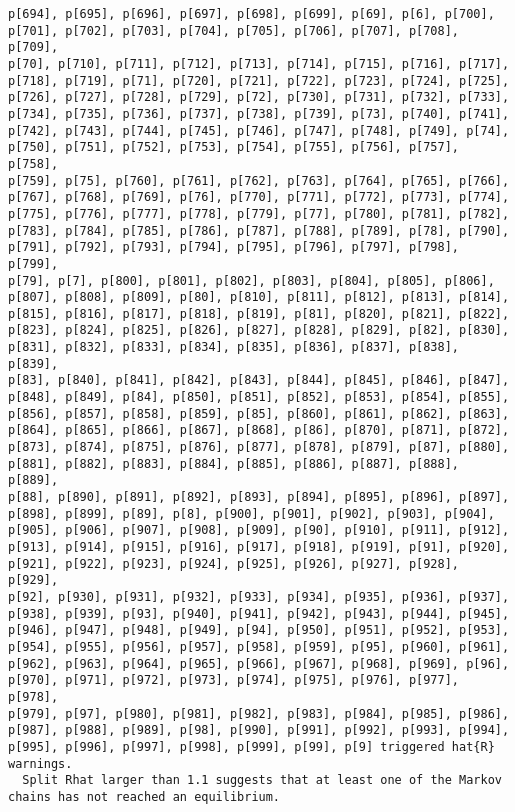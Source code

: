 \documentclass[
  letterpaper,
  DIV=11,
  numbers=noendperiod]{scrartcl}
\begin{document}
\begin{verbatim}
p[694], p[695], p[696], p[697], p[698], p[699], p[69], p[6], p[700],
p[701], p[702], p[703], p[704], p[705], p[706], p[707], p[708], p[709],
p[70], p[710], p[711], p[712], p[713], p[714], p[715], p[716], p[717],
p[718], p[719], p[71], p[720], p[721], p[722], p[723], p[724], p[725],
p[726], p[727], p[728], p[729], p[72], p[730], p[731], p[732], p[733],
p[734], p[735], p[736], p[737], p[738], p[739], p[73], p[740], p[741],
p[742], p[743], p[744], p[745], p[746], p[747], p[748], p[749], p[74],
p[750], p[751], p[752], p[753], p[754], p[755], p[756], p[757], p[758],
p[759], p[75], p[760], p[761], p[762], p[763], p[764], p[765], p[766],
p[767], p[768], p[769], p[76], p[770], p[771], p[772], p[773], p[774],
p[775], p[776], p[777], p[778], p[779], p[77], p[780], p[781], p[782],
p[783], p[784], p[785], p[786], p[787], p[788], p[789], p[78], p[790],
p[791], p[792], p[793], p[794], p[795], p[796], p[797], p[798], p[799],
p[79], p[7], p[800], p[801], p[802], p[803], p[804], p[805], p[806],
p[807], p[808], p[809], p[80], p[810], p[811], p[812], p[813], p[814],
p[815], p[816], p[817], p[818], p[819], p[81], p[820], p[821], p[822],
p[823], p[824], p[825], p[826], p[827], p[828], p[829], p[82], p[830],
p[831], p[832], p[833], p[834], p[835], p[836], p[837], p[838], p[839],
p[83], p[840], p[841], p[842], p[843], p[844], p[845], p[846], p[847],
p[848], p[849], p[84], p[850], p[851], p[852], p[853], p[854], p[855],
p[856], p[857], p[858], p[859], p[85], p[860], p[861], p[862], p[863],
p[864], p[865], p[866], p[867], p[868], p[86], p[870], p[871], p[872],
p[873], p[874], p[875], p[876], p[877], p[878], p[879], p[87], p[880],
p[881], p[882], p[883], p[884], p[885], p[886], p[887], p[888], p[889],
p[88], p[890], p[891], p[892], p[893], p[894], p[895], p[896], p[897],
p[898], p[899], p[89], p[8], p[900], p[901], p[902], p[903], p[904],
p[905], p[906], p[907], p[908], p[909], p[90], p[910], p[911], p[912],
p[913], p[914], p[915], p[916], p[917], p[918], p[919], p[91], p[920],
p[921], p[922], p[923], p[924], p[925], p[926], p[927], p[928], p[929],
p[92], p[930], p[931], p[932], p[933], p[934], p[935], p[936], p[937],
p[938], p[939], p[93], p[940], p[941], p[942], p[943], p[944], p[945],
p[946], p[947], p[948], p[949], p[94], p[950], p[951], p[952], p[953],
p[954], p[955], p[956], p[957], p[958], p[959], p[95], p[960], p[961],
p[962], p[963], p[964], p[965], p[966], p[967], p[968], p[969], p[96],
p[970], p[971], p[972], p[973], p[974], p[975], p[976], p[977], p[978],
p[979], p[97], p[980], p[981], p[982], p[983], p[984], p[985], p[986],
p[987], p[988], p[989], p[98], p[990], p[991], p[992], p[993], p[994],
p[995], p[996], p[997], p[998], p[999], p[99], p[9] triggered hat{R}
warnings.
  Split Rhat larger than 1.1 suggests that at least one of the Markov
chains has not reached an equilibrium.
 

\end{verbatim}
\end{document}

